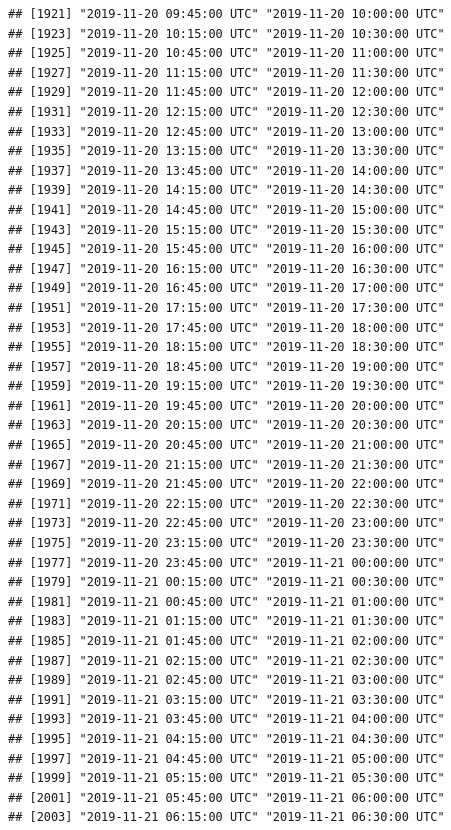 \documentclass{article}\usepackage[]{graphicx}\usepackage[]{color}
\makeatletter
\newenvironment{kframe}{%
 \def\at@end@of@kframe{}%
 \ifinner\ifhmode%
  \def\at@end@of@kframe{\end{minipage}}%
  \begin{minipage}{\columnwidth}%
 \fi\fi%
 \def\FrameCommand##1{\hskip\@totalleftmargin \hskip-\fboxsep
 \colorbox{shadecolor}{##1}\hskip-\fboxsep
     \hskip-\linewidth \hskip-\@totalleftmargin \hskip\columnwidth}%
 \MakeFramed {\advance\hsize-\width
   \@totalleftmargin\z@ \linewidth\hsize
   \@setminipage}}%
 {\par\unskip\endMakeFramed%
 \at@end@of@kframe}
\newenvironment{knitrout}{}{} %
\makeatother
\begin{document}
\begin{knitrout}
\begin{kframe}
\begin{verbatim}
## [1921] "2019-11-20 09:45:00 UTC" "2019-11-20 10:00:00 UTC"
## [1923] "2019-11-20 10:15:00 UTC" "2019-11-20 10:30:00 UTC"
## [1925] "2019-11-20 10:45:00 UTC" "2019-11-20 11:00:00 UTC"
## [1927] "2019-11-20 11:15:00 UTC" "2019-11-20 11:30:00 UTC"
## [1929] "2019-11-20 11:45:00 UTC" "2019-11-20 12:00:00 UTC"
## [1931] "2019-11-20 12:15:00 UTC" "2019-11-20 12:30:00 UTC"
## [1933] "2019-11-20 12:45:00 UTC" "2019-11-20 13:00:00 UTC"
## [1935] "2019-11-20 13:15:00 UTC" "2019-11-20 13:30:00 UTC"
## [1937] "2019-11-20 13:45:00 UTC" "2019-11-20 14:00:00 UTC"
## [1939] "2019-11-20 14:15:00 UTC" "2019-11-20 14:30:00 UTC"
## [1941] "2019-11-20 14:45:00 UTC" "2019-11-20 15:00:00 UTC"
## [1943] "2019-11-20 15:15:00 UTC" "2019-11-20 15:30:00 UTC"
## [1945] "2019-11-20 15:45:00 UTC" "2019-11-20 16:00:00 UTC"
## [1947] "2019-11-20 16:15:00 UTC" "2019-11-20 16:30:00 UTC"
## [1949] "2019-11-20 16:45:00 UTC" "2019-11-20 17:00:00 UTC"
## [1951] "2019-11-20 17:15:00 UTC" "2019-11-20 17:30:00 UTC"
## [1953] "2019-11-20 17:45:00 UTC" "2019-11-20 18:00:00 UTC"
## [1955] "2019-11-20 18:15:00 UTC" "2019-11-20 18:30:00 UTC"
## [1957] "2019-11-20 18:45:00 UTC" "2019-11-20 19:00:00 UTC"
## [1959] "2019-11-20 19:15:00 UTC" "2019-11-20 19:30:00 UTC"
## [1961] "2019-11-20 19:45:00 UTC" "2019-11-20 20:00:00 UTC"
## [1963] "2019-11-20 20:15:00 UTC" "2019-11-20 20:30:00 UTC"
## [1965] "2019-11-20 20:45:00 UTC" "2019-11-20 21:00:00 UTC"
## [1967] "2019-11-20 21:15:00 UTC" "2019-11-20 21:30:00 UTC"
## [1969] "2019-11-20 21:45:00 UTC" "2019-11-20 22:00:00 UTC"
## [1971] "2019-11-20 22:15:00 UTC" "2019-11-20 22:30:00 UTC"
## [1973] "2019-11-20 22:45:00 UTC" "2019-11-20 23:00:00 UTC"
## [1975] "2019-11-20 23:15:00 UTC" "2019-11-20 23:30:00 UTC"
## [1977] "2019-11-20 23:45:00 UTC" "2019-11-21 00:00:00 UTC"
## [1979] "2019-11-21 00:15:00 UTC" "2019-11-21 00:30:00 UTC"
## [1981] "2019-11-21 00:45:00 UTC" "2019-11-21 01:00:00 UTC"
## [1983] "2019-11-21 01:15:00 UTC" "2019-11-21 01:30:00 UTC"
## [1985] "2019-11-21 01:45:00 UTC" "2019-11-21 02:00:00 UTC"
## [1987] "2019-11-21 02:15:00 UTC" "2019-11-21 02:30:00 UTC"
## [1989] "2019-11-21 02:45:00 UTC" "2019-11-21 03:00:00 UTC"
## [1991] "2019-11-21 03:15:00 UTC" "2019-11-21 03:30:00 UTC"
## [1993] "2019-11-21 03:45:00 UTC" "2019-11-21 04:00:00 UTC"
## [1995] "2019-11-21 04:15:00 UTC" "2019-11-21 04:30:00 UTC"
## [1997] "2019-11-21 04:45:00 UTC" "2019-11-21 05:00:00 UTC"
## [1999] "2019-11-21 05:15:00 UTC" "2019-11-21 05:30:00 UTC"
## [2001] "2019-11-21 05:45:00 UTC" "2019-11-21 06:00:00 UTC"
## [2003] "2019-11-21 06:15:00 UTC" "2019-11-21 06:30:00 UTC"

\end{verbatim}
\end{kframe}
\end{knitrout}
\end{document}
